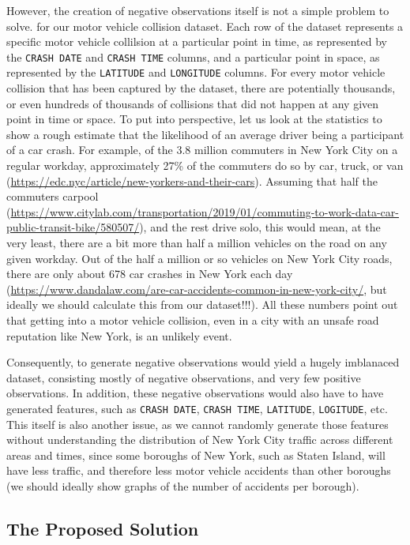 However, the creation of negative observations itself is not a simple
problem to solve. for our motor vehicle collision dataset. Each row of
the dataset represents a specific motor vehicle collilsion at a
particular point in time, as represented by the \texttt{CRASH\ DATE} and
\texttt{CRASH\ TIME} columns, and a particular point in space, as
represented by the \texttt{LATITUDE} and \texttt{LONGITUDE} columns. For
every motor vehicle collision that has been captured by the dataset,
there are potentially thousands, or even hundreds of thousands of
collisions that did not happen at any given point in time or space. To
put into perspective, let us look at the statistics to show a rough
estimate that the likelihood of an average driver being a participant of
a car crash. For example, of the 3.8 million commuters in New York City
on a regular workday, approximately 27\% of the commuters do so by car,
truck, or van
(\url{https://edc.nyc/article/new-yorkers-and-their-cars}). Assuming
that half the commuters carpool
(\url{https://www.citylab.com/transportation/2019/01/commuting-to-work-data-car-public-transit-bike/580507/}),
and the rest drive solo, this would mean, at the very least, there are a
bit more than half a million vehicles on the road on any given workday.
Out of the half a million or so vehicles on New York City roads, there
are only about 678 car crashes in New York each day
(\url{https://www.dandalaw.com/are-car-accidents-common-in-new-york-city/},
but ideally we should calculate this from our dataset!!!). All these
numbers point out that getting into a motor vehicle collision, even in a
city with an unsafe road reputation like New York, is an unlikely event.

Consequently, to generate negative observations would yield a hugely
imblanaced dataset, consisting mostly of negative observations, and very
few positive observations. In addition, these negative observations
would also have to have generated features, such as
\texttt{CRASH\ DATE}, \texttt{CRASH\ TIME}, \texttt{LATITUDE},
\texttt{LOGITUDE}, etc. This itself is also another issue, as we cannot
randomly generate those features without understanding the distribution
of New York City traffic across different areas and times, since some
boroughs of New York, such as Staten Island, will have less traffic, and
therefore less motor vehicle accidents than other boroughs (we should
ideally show graphs of the number of accidents per borough).

\hypertarget{the-proposed-solution}{%
\subsection{The Proposed Solution}\label{the-proposed-solution}}


